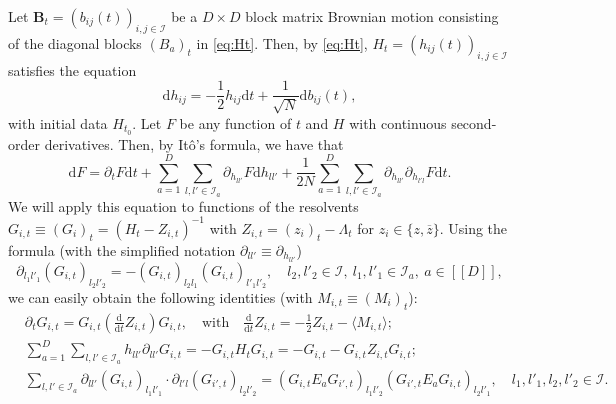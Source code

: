 \documentclass[10pt,reqno]{amsart}
\numberwithin{equation}{section}
\numberwithin{figure}{section}
\theoremstyle{plain} %
\theoremstyle{definition} %
\newcommand{\cal}{\mathcal}
\newcommand{\cI}{\mathcal{I}}
\newcommand{\dd}{\mathrm{d}}
\renewcommand{\bar}{\overline}
\newcommand{\qq}[1]{[\![{#1}]\!]}
\newcommand{\be}{\begin{equation}}
\newcommand{\ee}{\end{equation}}
\newcommand{\kk}{l'}
\numberwithin{equation}{section}
\begin{document}
Let $\mathbf{B}_t=\left(b_{i j}(t)\right)_{i,j\in \cI}$ be a $D  \times D $ block matrix Brownian motion consisting of the diagonal blocks $(B_a)_t$ in \eqref{eq:Ht}. Then, by \eqref{eq:Ht}, $H_t=(h_{ij}(t))_{i,j\in \cI}$ satisfies the equation 
$$
\dd h_{i j}=-\frac{1}{2} h_{i j} \dd t+\frac{1}{\sqrt{N}} \dd b_{i j}(t) ,
$$
with initial data $H_{t_0}$. Let $F$ be any function of $t$ and $H$ with continuous second-order derivatives. Then, by It{\^o}'s formula, we have that
\be\label{Ito}
\dd F=\partial_t F \dd t+ \sum_{a=1}^D \sum_{l,\kk \in \mathcal{I}_a} \partial_{h_{l\kk}} F \dd h_{l\kk}+\frac{1}{2 N} \sum_{a=1}^D \sum_{l,\kk \in \mathcal{I}_a} \partial_{h_{l\kk}}\partial_{ h_{\kk l}}  F \dd t.
\ee
We will apply this equation to functions of the resolvents $G_{i,t}\equiv (G_i)_t =(H_t-Z_{i,t})^{-1}$ with $Z_{i,t}=(z_{i})_{t}-\Lambda_t$ for $z_{i}\in \{z, \bar z\}$. 
Using the formula (with the simplified notation $\partial_{l\kk}\equiv \partial_{h_{l\kk}}$)
\begin{equation} \label{Ito_pro_1}
        \partial_{l_1\kk_1} \left(G_{i,t}\right)_{l_2\kk_2}= -\left(G_{i,t}\right)_{l_2l_1}\left(G_{i,t}\right)_{\kk_1\kk_2},\quad l_2,\kk_2 \in \cI, \ l_1,\kk_1\in \cal I_a, \ a\in \qq D,
\end{equation}
we can easily obtain the following identities (with $M_{i,t}\equiv (M_i)_t$):  
\begin{align} \label{Ito_pro_2}
&        \partial_{t}  G_{i,t}= G_{i,t}  \left(\frac{\dd}{\dd t}Z _{i,t}\right) G_{i,t},\quad \text{with}\quad \frac{\dd}{\dd t}Z_{i,t}=-\frac12 Z_{i,t}-\langle M_{i,t}\rangle; \\
 &\sum_{a=1}^D \sum_{l,\kk \in \mathcal{I}_a}  h_{l\kk}\partial_{l\kk} G_{i,t}  =-G_{i,t}H_t G_{i,t}=-G_{i,t}-G_{i,t}Z_{i,t}G_{i,t}; \label{Ito_pro_3}\\
 &       \sum_{l,\kk \in \mathcal{I}_a} \partial_{l\kk} \left(G_{i,t}\right)_{l_1\kk_1} \cdot \partial_{\kk l} \left(G_{i',t}\right)_{l_2\kk_2}  = \left(G_{i,t}E_{a}G_{i',t}\right)_{ l_1\kk_2} \left(G_{i',t}E_{a}G_{i,t}\right)_{l_2\kk_1},\quad l_1,\kk_1,l_2,\kk_2 \in \cI. \label{Ito_pro_4}
\end{align}
\end{document}
